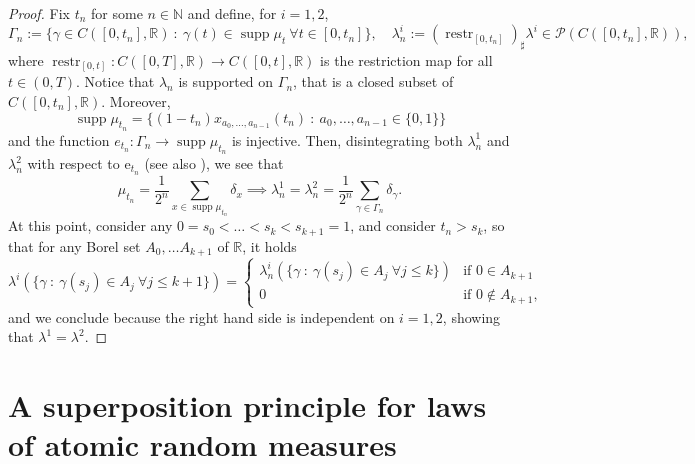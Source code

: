 \documentclass[10pt,leqno]{amsart}
\numberwithin{equation}{section}
\newcommand{\R}{\mathbb{R}}
\newcommand{\N}{\mathbb{N}}
\newcommand{\PP}{\mathcal{P}}
\newcommand{\supp}{\operatorname{supp}}
\newcommand{\e}{\mathrm{e}}
\begin{document}
\begin{proof}
    Fix $t_n$ for some $n\in \N$ and define, for $i=1,2$,
    \[\Gamma_n:= \big\{ \gamma \in C([0,t_n],\R) \ : \ \gamma(t) \in \operatorname{supp} \mu_t \ \forall t\in[0,t_n]\big\}, \quad \lambda^i_n:= (\operatorname{restr}_{[0,t_n]})_\sharp \lambda^i \in \PP(C([0,t_n],\R)),\]
    where $\operatorname{restr}_{[0,t]} : C([0,T] , \R) \to C([0,t],\R)$ is the restriction map for all $t \in (0,T)$. 
    Notice that $\lambda_n$ is supported on $\Gamma_n$, that is a closed subset of $C([0,t_n],\R)$. Moreover, 
    \[\operatorname{supp}\mu_{t_n} = \{(1-t_n)x_{a_0,\dots,a_{n-1}}(t_n) \ : \ a_0,\dots,a_{n-1} \in \{0,1\}\}\]
    and the function $e_{t_n} : \Gamma_n \to \operatorname{\supp}\mu_{t_n}$ is injective. Then, disintegrating both $\lambda_n^1$ and $\lambda_n^2$ with respect to $\e_{t_n}$ (see also \cite{CavSavSod25}), we see that
    \[\mu_{t_n} = \frac{1}{2^{n}}\sum_{x\in \operatorname{supp}\mu_{t_n}} \delta_x \implies \lambda^1_n = \lambda^2_n = \frac{1}{2^n}\sum_{\gamma \in \Gamma_n} \delta_\gamma.\]
    At this point, consider any $0=s_0 <\dots < s_k < s_{k+1}=1$, and consider $t_n>s_k$, so that for any Borel set $A_0, \dots A_{k+1}$ of $\R$, it holds
    \[\lambda^i(\{\gamma \ : \ \gamma(s_j) \in A_j \ \forall j\leq k+1\}) = 
    \begin{cases}
        \lambda^i_n(\{\gamma \ : \ \gamma(s_j) \in A_j \ \forall j\leq k\}) & \text{if }0 \in A_{k+1}
        \\
        0 & \text{if }0 \notin A_{k+1},
    \end{cases}\]
    and we conclude because the right hand side is independent on $i=1,2$, showing that $\lambda^1 = \lambda^2$. 
\end{proof}
\section{A superposition principle for laws of atomic random measures}\label{section atomic}
\end{document}
